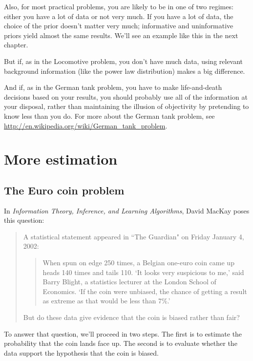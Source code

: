 \documentclass[12pt]{book}
\begin{document}
Also, for most practical problems, you are likely to be in one of two
regimes: either you have a lot of data or not very much.  If you have
a lot of data, the choice of the prior doesn't matter very much;
informative and uninformative priors yield almost the same results.
We'll see an example like this in the next chapter.

But if, as in the Locomotive problem, you don't have much data,
using relevant background information (like the power law distribution)
makes a big difference.

And if, as in the German tank problem, you have to make life-and-death
decisions based on your results, you should probably use all of the
information at your disposal, rather than maintaining the illusion of
objectivity by pretending to know less than you do.  For more about
the German tank problem, see
\url{http://en.wikipedia.org/wiki/German_tank_problem}.


\chapter{More estimation}

\section{The Euro coin problem}
\label{euro}

In {\it Information Theory, Inference, and Learning Algorithms}, David MacKay
poses this question:

\begin{quote}
A statistical statement appeared in ``The Guardian" on Friday January 4, 2002:

  \begin{quote}
        When spun on edge 250 times, a Belgian one-euro coin came
        up heads 140 times and tails 110.  `It looks very suspicious
        to me,' said Barry Blight, a statistics lecturer at the London
        School of Economics.  `If the coin were unbiased, the chance of
        getting a result as extreme as that would be less than 7\%.'
        \end{quote}

But do these data give evidence that the coin is biased rather than fair?
\end{quote}

To answer that question, we'll proceed in two steps.  The first
is to estimate the probability that the coin lands face up.  The second
is to evaluate whether the data support the hypothesis that the
coin is biased.
\end{document}
